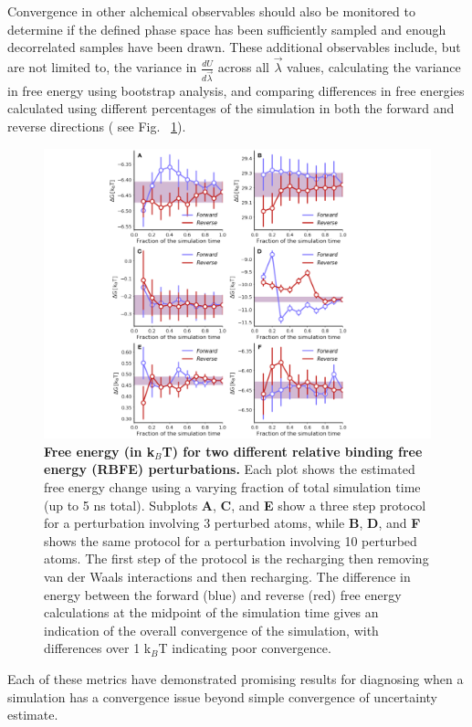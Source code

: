 \documentclass[9pt,bestpractices]{livecoms}
\begin{document}
%
Convergence in other alchemical observables should also be monitored to determine if the defined phase space has been sufficiently sampled and enough decorrelated samples have been drawn. These additional observables include, but are not limited to, the variance in $\frac{dU}{d\vec{\lambda}}$ across all $\vec{\lambda}$ values, calculating the variance in free energy using bootstrap analysis, and comparing differences in free energies calculated using different percentages of the simulation in both the forward and reverse directions ( see Fig. ~\ref{fig:convergence_forward_reverse}).
%
\begin{figure}
    \centering
    \includegraphics[width=0.95\linewidth]{figures/fig10_forward_reverse/Figure.pdf}
    \caption{\textbf{Free energy (in k$_{B}$T) for two different relative binding free energy (RBFE) perturbations.} 
    Each plot shows the estimated free energy change using a varying fraction of total simulation time (up to 5 ns total). 
    Subplots \textbf{A}, \textbf{C}, and \textbf{E} show a three step protocol  for a perturbation involving 3 perturbed atoms, while \textbf{B}, \textbf{D}, and \textbf{F} shows the same protocol for a perturbation involving 10 perturbed atoms. The first step of the protocol is the recharging then removing van der Waals interactions and then recharging. The difference in energy between the forward (blue) and reverse (red) free energy calculations at the midpoint of the simulation time gives an indication of the overall convergence of the simulation, with differences over 1 k$_{B}$T indicating poor convergence.}
    \label{fig:convergence_forward_reverse}
\end{figure}
%
Each of these metrics have demonstrated promising results for diagnosing when a simulation has a convergence issue beyond simple convergence of uncertainty estimate. 
\end{document}
